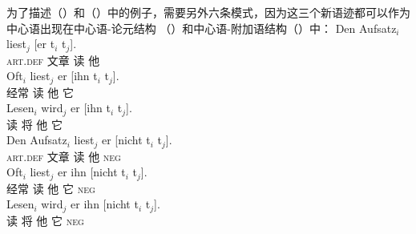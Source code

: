 为了描述（）和（）中的例子，需要另外六条模式，因为这三个新语迹都可以作为中心语出现在中心语-论元结构 （）和中心语-附加语结构（）中：
\eal
\ex 
\gll Den Aufsatz$_i$ liest$_j$ [er t$_i$ t$_j$].\\
	\textsc{art}.\textsc{def} 文章 读 \spacebr{}他\\
\ex 
\gll Oft$_i$ liest$_j$ er [ihn t$_i$ t$_j$].\\
	 经常 读 他 \spacebr{}它\\
\ex 
\gll Lesen$_i$ wird$_j$ er [ihn t$_i$ t$_j$].\\
	读 将 他 \spacebr{}它\\
\zl
\eal
\ex 
\gll Den Aufsatz$_i$ liest$_j$ er [nicht t$_i$ t$_j$].\\
	\textsc{art}.\textsc{def} 文章 读 他 \spacebr{}\textsc{neg}\\
\ex 
\gll Oft$_i$ liest$_j$ er ihn [nicht t$_i$ t$_j$].\\
	 经常 读 他 它 \spacebr{}\textsc{neg}\\
\ex 
\gll Lesen$_i$ wird$_j$ er ihn [nicht t$_i$ t$_j$].\\
	 读 将 他 它 \spacebr{}\textsc{neg}\\
